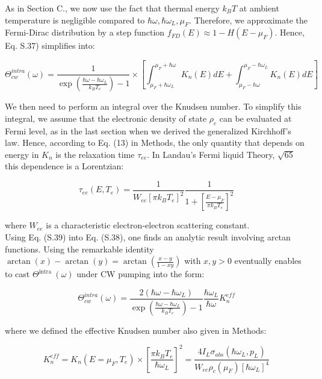 \documentclass[10pt]{article}
\begin{document}
As in Section C., we now use the fact that thermal energy $k_{B} T$ at ambient temperature is negligible compared to $\hbar \omega, \hbar \omega_{L}, \mu_{F}$. Therefore, we approximate the Fermi-Dirac distribution by a step function $f_{F D}(E) \approx 1-H\left(E-\mu_{F}\right)$. Hence, Eq. S.37) simplifies into:


\begin{equation*}
\Theta_{c w}^{i n t r a}(\omega)=\frac{1}{\exp \left(\frac{\hbar \omega-\hbar \omega_{L}}{k_{B} T_{e}}\right)-1} \times\left[\int_{\mu_{F}+\hbar \omega_{L}}^{\mu_{F}+\hbar \omega} K_{n}(E) d E+\int_{\mu_{F}-\hbar \omega}^{\mu_{F}-\hbar \omega_{L}} K_{n}(E) d E\right] \tag{S.38}
\end{equation*}


We then need to perform an integral over the Knudsen number. To simplify this integral, we assume that the electronic density of state $\rho_{c}$ can be evaluated at Fermi level, as in the last section when we derived the generalized Kirchhoff's law. Hence, according to Eq. (13) in Methods, the only quantity that depends on energy in $K_{n}$ is the relaxation time $\tau_{e e}$. In Landau's Fermi liquid Theory, $\sqrt{65}$ this dependence is a Lorentzian:


\begin{equation*}
\tau_{e e}\left(E, T_{e}\right)=\frac{1}{W_{e e}\left[\pi k_{B} T_{e}\right]^{2}} \frac{1}{1+\left[\frac{E-\mu_{F}}{\pi k_{B} T_{e}}\right]^{2}} \tag{S.39}
\end{equation*}


where $W_{e e}$ is a characteristic electron-electron scattering constant.\\
Using Eq. (S.39) into Eq. (S.38), one finds an analytic result involving arctan functions. Using the remarkable identity $\arctan (x)-\arctan (y)=\arctan \left(\frac{x-y}{1-x y}\right)$ with $x, y>0$ eventually enables to cast $\Theta^{\text {intra }}(\omega)$ under CW pumping into the form:


\begin{equation*}
\Theta_{c w}^{i n t r a}(\omega)=\frac{2\left(\hbar \omega-\hbar \omega_{L}\right)}{\exp \left(\frac{\hbar \omega-\hbar \omega_{L}}{k_{B} T_{e}}\right)-1} \frac{\hbar \omega_{L}}{\hbar \omega} K_{n}^{e f f} \tag{S.40}
\end{equation*}


where we defined the effective Knudsen number also given in Methods:


\begin{equation*}
K_{n}^{e f f}=K_{n}\left(E=\mu_{F}, T_{e}\right) \times\left[\frac{\pi k_{B} T_{e}}{\hbar \omega_{L}}\right]^{2}=\frac{4 I_{L} \sigma_{a b s}\left(\hbar \omega_{L}, p_{L}\right)}{W_{e e} \rho_{c}\left(\mu_{F}\right)\left[\hbar \omega_{L}\right]^{4}} \tag{S.41}
\end{equation*}
\end{document}
